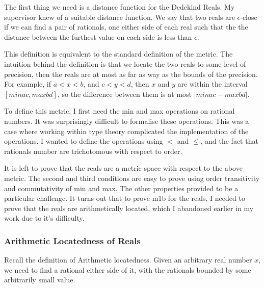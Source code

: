 \documentclass[ProjectReport]{subfiles}
\begin{document}
The first thing we need is a distance function for the Dedekind Reals. My supervisor knew of a suitable distance function. We say that two reals are $\epsilon$-close if we can find a pair of rationals, one either side of each real such that the the distance between the furthest value on each side is less than $\epsilon$. 


This definition is equivalent to the standard definition of the metric. The intuition behind the definition is that we locate the two reals to some level of precision, then the reals are at most as far as way as the bounds of the precision. For example, if $a < x < b$, and $c < y < d$, then $x$ and $y$ are within the interval $[min a c , max b d]$, so the difference between them is at most $| min a c - max b d |$.

To define this metric, I first need the min and max operations on rational numbers. It was surprisingly difficult to formalise these operations. This was a case where working within type theory complicated the implementation of the operations. I wanted to define the operations using $<$ and $\leq$, and the fact that rationals number are trichotomous with respect to order. 





It is left to prove that the reals are a metric space with respect to the above metric. The second and third conditions are easy to prove using order transitivity and commutativity of min and max. The other properties provided to be a particular challenge. It turns out that to prove m1b for the reals, I needed to prove that the reals are arithmetically located, which I abandoned earlier in my work due to it's difficulty.

\subsubsection{Arithmetic Locatedness of Reals}

Recall the definition of Arithmetic locatedness. Given an arbitrary real number $x$, we need to find a rational either side of it, with the rationals bounded by some arbitrarily small value.
\end{document}
